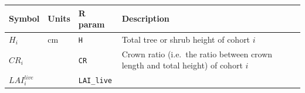 \documentclass[]{book}
\begin{document}
\begin{longtable}[]{@{}llll@{}}
\toprule
\begin{minipage}[b]{0.11\columnwidth}\raggedright
Symbol\strut
\end{minipage} & \begin{minipage}[b]{0.10\columnwidth}\raggedright
Units\strut
\end{minipage} & \begin{minipage}[b]{0.12\columnwidth}\raggedright
R param\strut
\end{minipage} & \begin{minipage}[b]{0.45\columnwidth}\raggedright
Description\strut
\end{minipage}\tabularnewline
\midrule
\endhead
\begin{minipage}[t]{0.11\columnwidth}\raggedright
\(H_i\)\strut
\end{minipage} & \begin{minipage}[t]{0.10\columnwidth}\raggedright
cm\strut
\end{minipage} & \begin{minipage}[t]{0.12\columnwidth}\raggedright
\texttt{H}\strut
\end{minipage} & \begin{minipage}[t]{0.45\columnwidth}\raggedright
Total tree or shrub height of cohort \(i\)\strut
\end{minipage}\tabularnewline
\begin{minipage}[t]{0.11\columnwidth}\raggedright
\(CR_i\)\strut
\end{minipage} & \begin{minipage}[t]{0.10\columnwidth}\raggedright
\strut
\end{minipage} & \begin{minipage}[t]{0.12\columnwidth}\raggedright
\texttt{CR}\strut
\end{minipage} & \begin{minipage}[t]{0.45\columnwidth}\raggedright
Crown ratio (i.e.~the ratio between crown length and total height) of cohort \(i\)\strut
\end{minipage}\tabularnewline
\begin{minipage}[t]{0.11\columnwidth}\raggedright
\(LAI^{live}_i\)\strut
\end{minipage} & \begin{minipage}[t]{0.10\columnwidth}\raggedright
\strut
\end{minipage} & \begin{minipage}[t]{0.12\columnwidth}\raggedright
\texttt{LAI\_live}\strut

\end{minipage}
\end{longtable}
\end{document}
